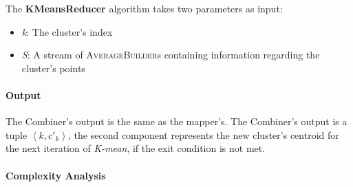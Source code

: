 \documentclass[parskip=full]{report}
\begin{document}
The \textbf{KMeansReducer} algorithm takes two parameters as input:
\begin{itemize}
	\item \textit{k}: The cluster's index
	\item \textit{S}: A stream of \textsc{AverageBuilder}s containing 
	information regarding the cluster's points
\end{itemize}

\paragraph{Output}

The Combiner's output is the same as the mapper's. The Combiner's output is a 
tuple $\left\langle k, {c'}_k \right\rangle$, the second component represents 
the new cluster's centroid for the next iteration of \emph{K-mean}, if the exit 
condition is not met.

%



%

\paragraph{Complexity Analysis}
\end{document}
